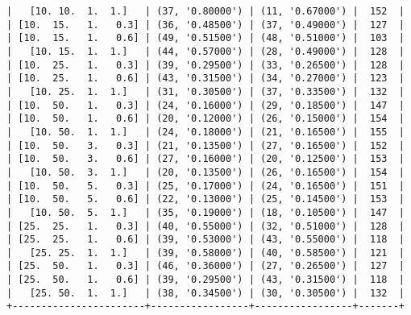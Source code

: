 \documentclass{article}
\begin{document}
\begin{verbatim}
|   [10. 10.  1.  1.]   | (37, '0.80000') | (11, '0.67000') |  152  |
| [10.  15.   1.   0.3] | (36, '0.48500') | (37, '0.49000') |  127  |
| [10.  15.   1.   0.6] | (49, '0.51500') | (48, '0.51000') |  103  |
|   [10. 15.  1.  1.]   | (44, '0.57000') | (28, '0.49000') |  128  |
| [10.  25.   1.   0.3] | (39, '0.29500') | (33, '0.26500') |  128  |
| [10.  25.   1.   0.6] | (43, '0.31500') | (34, '0.27000') |  123  |
|   [10. 25.  1.  1.]   | (31, '0.30500') | (37, '0.33500') |  132  |
| [10.  50.   1.   0.3] | (24, '0.16000') | (29, '0.18500') |  147  |
| [10.  50.   1.   0.6] | (20, '0.12000') | (26, '0.15000') |  154  |
|   [10. 50.  1.  1.]   | (24, '0.18000') | (21, '0.16500') |  155  |
| [10.  50.   3.   0.3] | (21, '0.13500') | (27, '0.16500') |  152  |
| [10.  50.   3.   0.6] | (27, '0.16000') | (20, '0.12500') |  153  |
|   [10. 50.  3.  1.]   | (20, '0.13500') | (26, '0.16500') |  154  |
| [10.  50.   5.   0.3] | (25, '0.17000') | (24, '0.16500') |  151  |
| [10.  50.   5.   0.6] | (22, '0.13000') | (25, '0.14500') |  153  |
|   [10. 50.  5.  1.]   | (35, '0.19000') | (18, '0.10500') |  147  |
| [25.  25.   1.   0.3] | (40, '0.55000') | (32, '0.51000') |  128  |
| [25.  25.   1.   0.6] | (39, '0.53000') | (43, '0.55000') |  118  |
|   [25. 25.  1.  1.]   | (39, '0.58000') | (40, '0.58500') |  121  |
| [25.  50.   1.   0.3] | (46, '0.36000') | (27, '0.26500') |  127  |
| [25.  50.   1.   0.6] | (39, '0.29500') | (43, '0.31500') |  118  |
|   [25. 50.  1.  1.]   | (38, '0.34500') | (30, '0.30500') |  132  |
+-----------------------+-----------------+-----------------+-------+
\end{verbatim}
\end{document}
